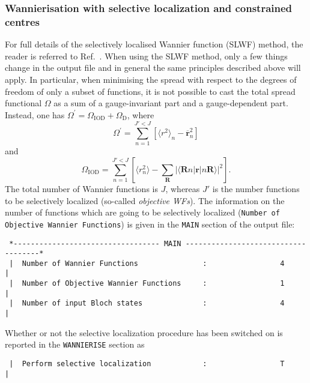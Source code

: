 \subsubsection{Wannierisation with selective localization and constrained centres}
For full details of the selectively localised Wannier function (SLWF) method, the reader is 
referred to Ref.~\cite{Marianetti}. 
When using the SLWF method, only a few things change in the output file
and in general the same principles described above will apply. 
In particular, when minimising the spread with respect to the degrees of freedom of only a subset 
of functions, it is not possible to cast the total spread functional $\Omega$ as a sum of a 
gauge-invariant part and a gauge-dependent part. Instead, one has
$\Omega^{'} = \Omega_{\mathrm{IOD}} + \Omega_{\mathrm{D}}$, where
$$\Omega^{'} = \sum_{n=1}^{J'<J} \left[\langle r^2 \rangle_n - \overline{\mathbf{r}}_{n}^{2}\right]$$
and 
$$\Omega_{\mathrm{IOD}} = \sum_{n=1}^{J'<J} \left[\langle r^2_n \rangle- \sum_{\mathbf{R}} \vert\langle\mathbf{R}n\vert \mathbf{r} \vert n\mathbf{R}\rangle\vert^2 \right].$$
The total number of Wannier functions is $J$, whereas $J'$ is the number functions to be selectively localized (so-called \emph{objective WFs}).
The information on the number of functions which are going to be selectively localized \mbox{({\tt Number of Objective Wannier Functions})}
is given in the {\tt MAIN} section of the output file:
\begin{verbatim}
 *---------------------------------- MAIN ------------------------------------*
 |  Number of Wannier Functions               :                 4             |
 |  Number of Objective Wannier Functions     :                 1             |
 |  Number of input Bloch states              :                 4             |
\end{verbatim}
Whether or not the selective localization procedure has been switched on is reported in
the {\tt WANNIERISE} section as
\begin{verbatim}
 |  Perform selective localization            :                 T             |
\end{verbatim}

